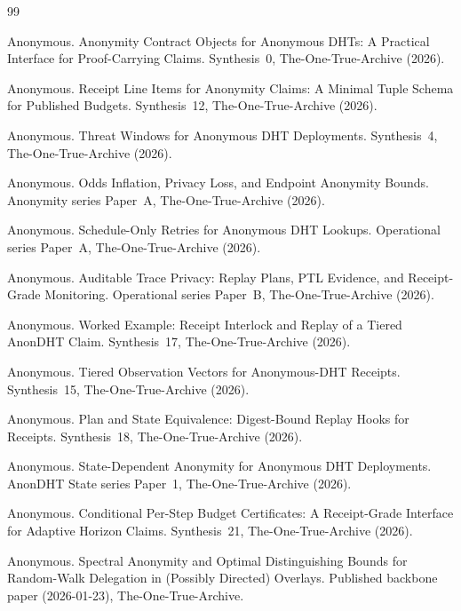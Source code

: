 \documentclass[11pt]{article}
\begin{document}
\begin{thebibliography}{99}\small

Anonymous.
\newblock Anonymity Contract Objects for Anonymous DHTs: A Practical Interface for Proof-Carrying Claims.
\newblock Synthesis~0, The-One-True-Archive (2026).

Anonymous.
\newblock Receipt Line Items for Anonymity Claims: A Minimal Tuple Schema for Published Budgets.
\newblock Synthesis~12, The-One-True-Archive (2026).

Anonymous.
\newblock Threat Windows for Anonymous DHT Deployments.
\newblock Synthesis~4, The-One-True-Archive (2026).

Anonymous.
\newblock Odds Inflation, Privacy Loss, and Endpoint Anonymity Bounds.
\newblock Anonymity series Paper~A, The-One-True-Archive (2026).

Anonymous.
\newblock Schedule-Only Retries for Anonymous DHT Lookups.
\newblock Operational series Paper~A, The-One-True-Archive (2026).

Anonymous.
\newblock Auditable Trace Privacy: Replay Plans, PTL Evidence, and Receipt-Grade Monitoring.
\newblock Operational series Paper~B, The-One-True-Archive (2026).

Anonymous.
\newblock Worked Example: Receipt Interlock and Replay of a Tiered AnonDHT Claim.
\newblock Synthesis~17, The-One-True-Archive (2026).

Anonymous.
\newblock Tiered Observation Vectors for Anonymous-DHT Receipts.
\newblock Synthesis~15, The-One-True-Archive (2026).

Anonymous.
\newblock Plan and State Equivalence: Digest-Bound Replay Hooks for Receipts.
\newblock Synthesis~18, The-One-True-Archive (2026).

Anonymous.
\newblock State-Dependent Anonymity for Anonymous DHT Deployments.
\newblock AnonDHT State series Paper~1, The-One-True-Archive (2026).

Anonymous.
\newblock Conditional Per-Step Budget Certificates: A Receipt-Grade Interface for Adaptive Horizon Claims.
\newblock Synthesis~21, The-One-True-Archive (2026).

Anonymous.
\newblock Spectral Anonymity and Optimal Distinguishing Bounds for Random-Walk Delegation in (Possibly Directed) Overlays.
\newblock Published backbone paper (2026-01-23), The-One-True-Archive.


\end{thebibliography}
\end{document}
